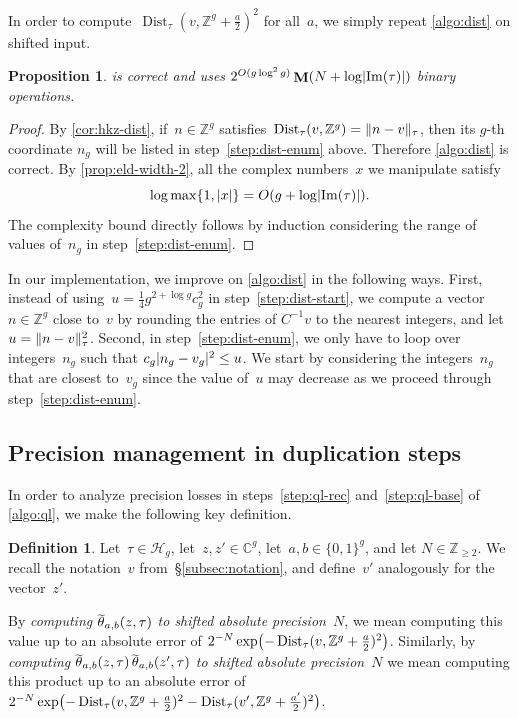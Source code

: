 \documentclass[12pt,oneside]{amsart}
\numberwithin{equation}{section}
\newtheorem{prop}[equation]{Proposition}
\theoremstyle{definition}
\newtheorem{defn}[equation]{Definition}
\newcommand{\Z}{\mathbb{Z}}
\newcommand{\C}{\mathbb{C}}
\newcommand{\Half}{\mathcal{H}}
\DeclareMathOperator{\im}{Im}
\DeclareMathOperator{\Dist}{Dist}
\DeclareMathOperator{\thetatilde}{\rlap{\raisebox{-0.1ex}{$\widetilde{\phantom{\,t}}$}}\theta}
\DeclareMathOperator{\Mul}{\mathbf{M}}
\DeclarePairedDelimiter{\abs}{|}{|}
\DeclarePairedDelimiter{\paren}{(}{)}
\DeclarePairedDelimiter{\norm}{\|}{\|}
\begin{document}
In order to compute~$\Dist_\tau(v, \Z^g + \tfrac{a}{2})^2$ for all~$a$, we simply
repeat \cref{algo:dist} on shifted input.

\begin{prop}
  \label{prop:distances}  is correct and uses
  $2^{O(g\log^2 g)} \Mul(N + \log\abs{\im(\tau)})$ binary operations.
\end{prop}

\begin{proof}
  By \cref{cor:hkz-dist}, if~$n\in \Z^g$
  satisfies~$\Dist_\tau(v,\Z^g) = \norm{n-v}_\tau$, then its $g$-th coordinate
  $n_g$ will be listed in step~\eqref{step:dist-enum} above. Therefore
  \cref{algo:dist} is correct. By \cref{prop:eld-width-2}, all the complex
  numbers~$x$ we manipulate satisfy
  \begin{displaymath}
    \log\max\{1,\abs{x}\} = O(g + \log\abs{\im(\tau)}).
  \end{displaymath}
  The complexity bound directly follows by induction considering the range of
  values of~$n_g$ in step~\eqref{step:dist-enum}.
\end{proof}

In our implementation, we improve on \cref{algo:dist} in the following
ways. First, instead of using~$u = \frac14 g^{2+\log g}c_g^2$ in
step~\eqref{step:dist-start}, we compute a vector~$n\in \Z^g$ close to~$v$ by
rounding the entries of $C^{-1}v$ to the nearest integers, and
let~$u = \norm{n-v}_\tau^2$. Second, in step~\eqref{step:dist-enum}, we only
have to loop over integers~$n_g$ such that $c_g\abs{n_g - v_g}^2 \leq u$. We
start by considering the integers~$n_g$ that are closest to~$v_g$ since the
value of~$u$ may decrease as we proceed through
step~\eqref{step:dist-enum}.

\subsection{Precision management in duplication steps}
\label{subsec:precision}

In order to analyze precision losses in steps~\eqref{step:ql-rec}
and~\eqref{step:ql-base} of \cref{algo:ql}, we make the following key
definition.

\begin{defn}
  \label{def:shifted}
  Let~$\tau\in \Half_g$, let~$z,z'\in \C^g$, let~$a,b\in \{0,1\}^g$, and let
  $N\in \Z_{\geq 2}$. We recall the notation~$v$ from~§\ref{subsec:notation},
  and define~$v'$ analogously for the vector~$z'$.

  By \emph{computing $\thetatilde_{a,b}(z,\tau)$ to shifted absolute
    precision~$N$}, we mean computing this value up to an absolute error of
  $2^{-N} \exp\paren[\big]{-\Dist_\tau(v, \Z^g + \tfrac a2)^2}$. Similarly, by
  \emph{computing $\thetatilde_{a,b}(z,\tau)\thetatilde_{a,b}(z',\tau)$ to
    shifted absolute precision~$N$} we mean computing this product up to an
  absolute error of
  $2^{-N}\exp\paren[\big]{-\Dist_\tau(v, \Z^g + \tfrac a2)^2 - \Dist_\tau(v',
    \Z^g + \tfrac{a'}{2})^2}$.
\end{defn}
\end{document}
